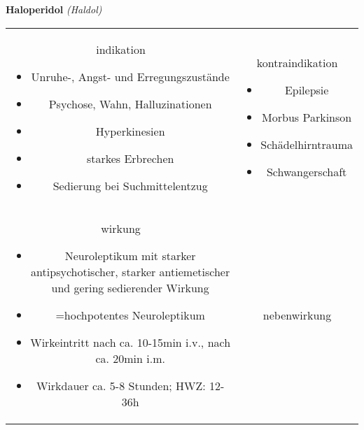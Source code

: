 \begin{frame}{
    \textbf{Haloperidol}
    \textit{(Haldol)}
}
    \begin{tabular}{c c}
        \begin{beamercolorbox}[wd=\boxwidth\textwidth,ht=\boxheight\textheight,sep=1em]{indikation}
            \scriptsize
            \begin{itemize}
                \item Unruhe-, Angst- und Erregungszustände
                \item Psychose, Wahn, Halluzinationen
                \item Hyperkinesien
                \item starkes Erbrechen
                \item Sedierung bei Suchmittelentzug
            \end{itemize}
        \end{beamercolorbox} & 
        \begin{beamercolorbox}[wd=\boxwidth\textwidth,ht=\boxheight\textheight,sep=1em]{kontraindikation}
            \scriptsize
            \begin{itemize}
                \item Epilepsie
                \item Morbus Parkinson
                \item Schädelhirntrauma
                \item Schwangerschaft
            \end{itemize}
        \end{beamercolorbox} \\
        \begin{beamercolorbox}[wd=\boxwidth\textwidth,ht=\boxheight\textheight,sep=1em]{wirkung}
            \scriptsize
            \begin{itemize}
                \item Neuroleptikum mit starker antipsychotischer, starker antiemetischer und gering sedierender Wirkung
                \item =hochpotentes Neuroleptikum
                \item Wirkeintritt nach ca. 10-15min i.v., nach ca. 20min i.m.
                \item Wirkdauer ca. 5-8 Stunden; HWZ: 12-36h
            \end{itemize}
        \end{beamercolorbox} & 
        \begin{beamercolorbox}[wd=\boxwidth\textwidth,ht=\boxheight\textheight,sep=1em]{nebenwirkung}

\end{beamercolorbox}
\end{tabular}
\end{frame}
